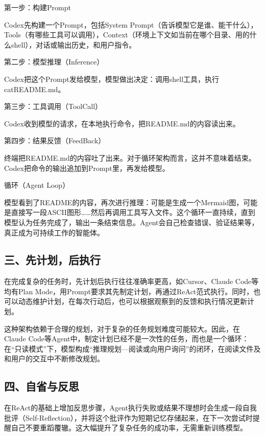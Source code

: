 第一步：构建Prompt

Codex先构建一个Prompt，包括System Prompt（告诉模型它是谁、能干什么）， Tools（有哪些工具可以调用），Context（环境上下文如当前在哪个目录、用的什么shell），对话或输出历史，和用户指令。

第二步：模型推理（Inference）

Codex把这个Prompt发给模型，模型做出决定：调用shell工具，执行catREADME.md。

第三步：工具调用（ToolCall）

Codex收到模型的请求，在本地执行命令，把README.md的内容读出来。

第四步：结果反馈（FeedBack）

终端把README.md的内容吐了出来。对于循环架构而言，这并不意味着结束。Codex把命令的输出追加到Prompt里，再发给模型。

循环（Agent Loop）

模型看到了README的内容，再次进行推理：可能是生成一个Mermaid图，可能是直接写一段ASCII图形\ldots\ldots 然后再调用工具写入文件。这个循环一直持续，直到模型认为任务完成了，输出一条结束信息。Agent会自己检查错误、验证结果等，真正成为可持续工作的智能体。

\hypertarget{ux4e09ux5148ux8ba1ux5212ux540eux6267ux884c}{%
\subsection{三、先计划，后执行}\label{ux4e09ux5148ux8ba1ux5212ux540eux6267ux884c}}

在完成复杂的任务时，先计划后执行往往准确率更高，如Cursor、Claude Code等均有Plan Mode，用Prompt要求其先制定计划，再通过ReAct范式执行。同时，也可以动态维护计划，在每次行动后，也可以根据观察到的反馈和执行情况更新计划。

这种架构依赖于合理的规划，对于复杂的任务规划难度可能较大。因此，在Claude Code等Agent中，制定计划已经不是一次性的任务，而也是一个循环：在``只读模式''下，模型构成``推理规划---阅读或向用户询问''的闭环，在阅读文件及和用户的交互中不断修改规划。

\hypertarget{ux56dbux81eaux7701ux4e0eux53cdux601d}{%
\subsection{四、自省与反思}\label{ux56dbux81eaux7701ux4e0eux53cdux601d}}

在ReAct的基础上增加反思步骤，Agent执行失败或结果不理想时会生成一段自我批评（Self-Reflection），并将这个批评作为短期记忆存储起来，在下一次尝试时提醒自己不要重蹈覆辙。这大幅提升了复杂任务的成功率，无需重新训练模型。

